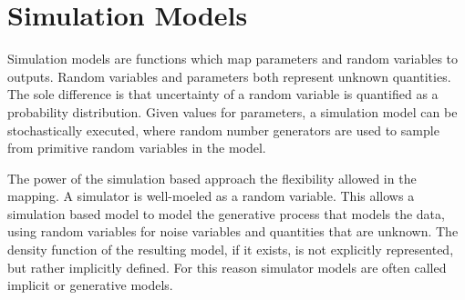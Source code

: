 
\section{Simulation Models}\label{condknow}

Simulation models are functions which map parameters and random variables to outputs.
Random variables and parameters both represent unknown quantities.
The sole difference is that uncertainty of a random variable is quantified as a probability distribution.
Given values for parameters, a simulation model can be stochastically executed, where random number generators are used to sample from primitive random variables in the model.

The power of the simulation based approach the flexibility allowed in the mapping.
A simulator is well-moeled as a random variable.
This allows a simulation based model to model the generative process that models the data, using random variables for noise variables and quantities that are unknown.  The density function of the resulting model, if it exists, is not explicitly represented, but rather implicitly defined.
For this reason simulator models are often called implicit or generative models.



